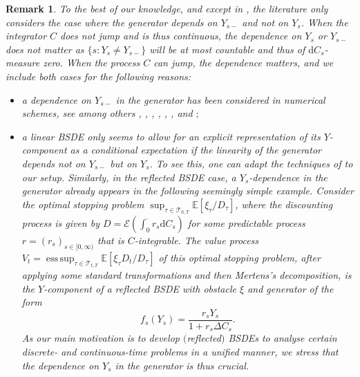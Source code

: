 \documentclass[10pt]{article} %
\newtheorem{remark}[theorem]{Remark}
\newcommand\cE{\mathcal E}
\newcommand\cT{\mathcal T}
\def \E{\mathbb{E}}
\def\d{\mathrm{d}}
\DeclareMathOperator*{\esssup}{ess\,sup}
\begin{document}
\begin{remark}\label{rem::discussion_y}
	To the best of our knowledge, and except in {\rm\cite{papapantoleon2018existence}}, the literature only considers the case where the generator depends on $Y_{s-}$ and not on $Y_s$. When the integrator $C$ does not jump and is thus continuous, the dependence on $Y_s$ or $Y_{s-}$ does not matter as $\{s :Y_s \neq Y_{s-}\}$ will be at most countable and thus of $\d C_s$-measure zero. When the process $C$ can jump, the dependence matters, and we include both cases for the following reasons:
	
	\begin{itemize}
	\item[$(i)$] a dependence on $Y_{s-}$ in the generator has been considered in numerical schemes, see among others {\rm\citeauthor*{briand2001donsker} \cite{briand2001donsker}, \citeauthor*{briand2002robustness} \cite{briand2002robustness}, \citeauthor*{briand2021donsker} \cite{briand2021donsker}, \citeauthor*{cheridito2013bs} \cite{cheridito2013bs}, \citeauthor*{madan2015convergence} \cite{madan2015convergence}}, {\rm\citeauthor*{possamai2015weak} \cite{possamai2015weak}}, and {\rm\citeauthor*{papapantoleon2021stability} \cite{papapantoleon2019stability,papapantoleon2021stability}}$;$
	
	\item[$(ii)$] a linear {\rm BSDE} only seems to allow for an explicit representation of its $Y$-component as a conditional expectation if the linearity of the generator depends not on $Y_{s-}$ but on $Y_s$. To see this, one can adapt the techniques of {\rm\cite[Lemma 2.2]{carbone2008backward}} to our setup. Similarly, in the reflected {\rm BSDE} case, a $Y_s$-dependence in the generator already appears in the following seemingly simple example. Consider the optimal stopping problem $\sup_{\tau \in \cT_{0,T}} \E[\xi_\tau/D_\tau]$, where the discounting process is given by $D = \cE(\int_0^\cdot r_s \d C_s)$ for some predictable process $r = (r_s)_{s \in [0,\infty)}$ that is $C$-integrable. The value process $V_t = \esssup_{\tau \in \cT_{t,T}} \E[\xi_\tau D_t/D_\tau]$ of this optimal stopping problem, after applying some standard transformations and then Mertens's decomposition, is the $Y$-component of a reflected {\rm BSDE} with obstacle $\xi$ and generator of the form 
		\begin{equation*}
			f_s(Y_s) = \frac{r_s Y_s}{1+r_s\Delta C_s}.
		\end{equation*}
		As our main motivation is to develop $($reflected$)$ {\rm BSDEs} to analyse certain discrete- and continuous-time problems in a unified manner, we stress that the dependence on $Y_s$ in the generator is thus crucial.
	\end{itemize}
\end{remark}
\end{document}
